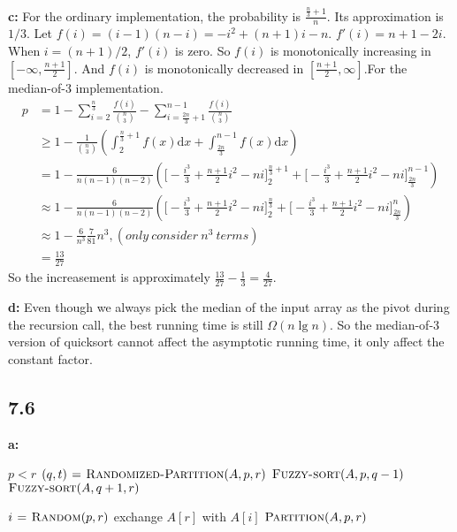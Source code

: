 \documentclass{book}
\begin{document}
\begin{CJK}{UTF8}{gkai}
\textbf{c:}
For the ordinary implementation, the probability is $\frac{\frac{n}{3}+1}{n}$.  
Its approximation is $1/3$. Let $f(i) = (i-1)(n-i) = -i^2+(n+1)i-n$. $f'(i) = 
n+1-2i$. When $i=(n+1)/2$, $f'(i)$ is zero. So $f(i)$ is monotonically 
increasing in $[-\infty, \frac{n+1}{2}]$. And $f(i)$ is monotonically decreased 
in $[\frac{n+1}{2},\infty]$.For the median-of-3 implementation.  
\begin{align*}
p & = 1 - \sum_{i=2}^{\frac{n}{3}}\frac{f(i)}{\binom{n}{3}} - 
\sum_{i=\frac{2n}{3} + 1}^{n-1}\frac{f(i)}{\binom{n}{3}} \\
& \ge 1 - \frac{1}{\binom{n}{3}}(\int_2^{\frac{n}{3}+1}f(x)\mathrm{d}x + 
\int_{\frac{2n}{3}}^{n-1}f(x)\mathrm{d}x) \\
& = 1 - 
\frac{6}{n(n-1)(n-2)}(\Big[-\frac{i^3}{3}+\frac{n+1}{2}i^2-ni\Big]_2^{\frac{n}{3}+1}+
\Big[-\frac{i^3}{3}+\frac{n+1}{2}i^2-ni\Big]_{\frac{2n}{3}}^{n-1}) \\
& \approx 
1 - 
  \frac{6}{n(n-1)(n-2)}(\Big[-\frac{i^3}{3}+\frac{n+1}{2}i^2-ni\Big]_2^{\frac{n}{3}}+
\Big[-\frac{i^3}{3}+\frac{n+1}{2}i^2-ni\Big]_{\frac{2n}{3}}^{n}) \\
& \approx 1 - \frac{6}{n^3} \frac{7}{81}n^3, (only\: consider\: n^3\: terms) \\
& = \frac{13}{27}
\end{align*}
So the increasement is approximately $\frac{13}{27}-\frac{1}{3}=\frac{4}{27}$.

\textbf{d:} Even though we always pick the median of the input array as the pivot
during the recursion call, the best running time is still $\Omega(n \lg n)$. So 
the median-of-3 version of quicksort cannot affect the asymptotic running time, 
it only affect the constant factor.

\subsection*{7.6}
\textbf{a:}
\begin{codebox}
\li \If $p < r$
\li \Then $(q,t) \mathrel{\hspace{1pt}=\hspace{1pt}} \textnormal{\scshape Randomized-Partition}(A,p,r)$
\li $\textnormal{\scshape Fuzzy-sort}(A,p,q-1)$
\li $\textnormal{\scshape Fuzzy-sort}(A,q+1,r)$
\end{codebox}

\begin{codebox}
\li $i \mathrel{\hspace{1pt}=\hspace{1pt}} \textnormal{\scshape Random}(p,r)$
\li exchange $A[r]$ with $A[i]$
\li \Return $\textnormal{\scshape Partition}(A,p,r)$
\end{codebox}


\end{CJK}
\end{document}
